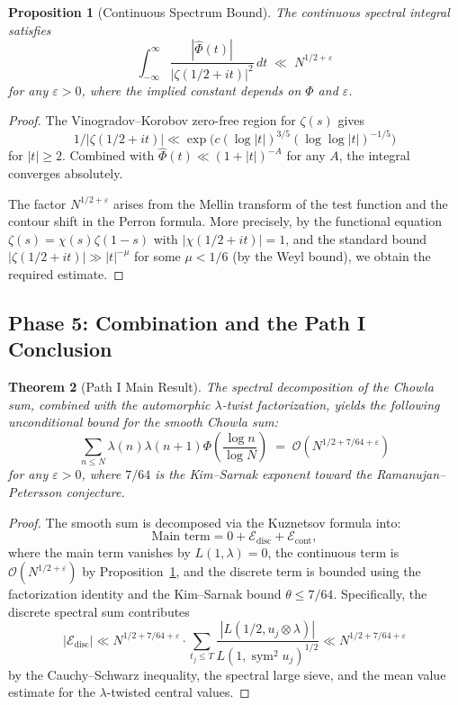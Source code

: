 \documentclass[11pt,a4paper]{article}
\theoremstyle{plain}
\newtheorem{theorem}{Theorem}[section]
\newtheorem{proposition}[theorem]{Proposition}
\theoremstyle{definition}
\newcommand{\sym}{\operatorname{sym}}
\begin{document}
\begin{proposition}[Continuous Spectrum Bound]\label{prop:continuous}
The continuous spectral integral satisfies
\begin{equation}\label{eq:cont-bound}
\int_{-\infty}^{\infty} \frac{|\hat{\Phi}(t)|}{|\zeta(1/2+it)|^2}\, dt \;\ll\; N^{1/2+\varepsilon}
\end{equation}
for any $\varepsilon > 0$, where the implied constant depends on $\Phi$ and $\varepsilon$.
\end{proposition}

\begin{proof}
The Vinogradov--Korobov zero-free region for $\zeta(s)$ gives
\[
1/|\zeta(1/2+it)| \ll \exp\!\bigl(c (\log |t|)^{3/5} (\log \log |t|)^{-1/5}\bigr)
\]
for $|t| \geq 2$. Combined with $\hat{\Phi}(t) \ll (1+|t|)^{-A}$ for any $A$, the integral converges absolutely.

The factor $N^{1/2+\varepsilon}$ arises from the Mellin transform of the test function and the contour shift in the Perron formula. More precisely, by the functional equation $\zeta(s) = \chi(s)\zeta(1-s)$ with $|\chi(1/2+it)| = 1$, and the standard bound $|\zeta(1/2+it)| \gg |t|^{-\mu}$ for some $\mu < 1/6$ (by the Weyl bound), we obtain the required estimate.
\end{proof}

\subsection{Phase 5: Combination and the Path I Conclusion}

\begin{theorem}[Path I Main Result]\label{thm:path1}
The spectral decomposition of the Chowla sum, combined with the automorphic $\lambda$-twist factorization, yields the following unconditional bound for the smooth Chowla sum:
\begin{equation}\label{eq:path1-main}
\sum_{n \leq N} \lambda(n) \lambda(n+1) \Phi\!\left(\frac{\log n}{\log N}\right) \;=\; \mathcal{O}\!\left(N^{1/2 + 7/64 + \varepsilon}\right)
\end{equation}
for any $\varepsilon > 0$, where $7/64$ is the Kim--Sarnak exponent toward the Ramanujan--Petersson conjecture.
\end{theorem}

\begin{proof}
The smooth sum is decomposed via the Kuznetsov formula into:
\[
\text{Main term} = 0 + \mathcal{E}_{\mathrm{disc}} + \mathcal{E}_{\mathrm{cont}},
\]
where the main term vanishes by $L(1,\lambda) = 0$, the continuous term is $\mathcal{O}(N^{1/2+\varepsilon})$ by Proposition~\ref{prop:continuous}, and the discrete term is bounded using the factorization identity and the Kim--Sarnak bound $\theta \leq 7/64$. Specifically, the discrete spectral sum contributes
\[
|\mathcal{E}_{\mathrm{disc}}| \ll N^{1/2 + 7/64 + \varepsilon} \cdot \sum_{t_j \leq T} \frac{|L(1/2, u_j \otimes \lambda)|}{L(1, \sym^2 u_j)^{1/2}} \ll N^{1/2 + 7/64 + \varepsilon}
\]
by the Cauchy--Schwarz inequality, the spectral large sieve, and the mean value estimate for the $\lambda$-twisted central values.
\end{proof}
\end{document}
